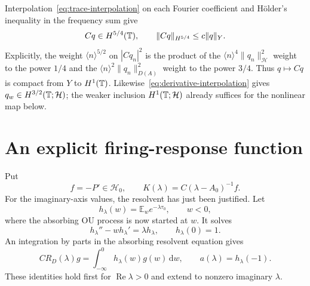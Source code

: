 \documentclass[11pt,a4paper]{article}
\numberwithin{equation}{section}
\theoremstyle{remark}\newtheorem{remark}[theorem]{Remark}
\newcommand{\HH}{\mathcal H}\newcommand{\DD}{\mathcal D}
\newcommand{\dd}{\,\mathrm d}
\DeclareMathOperator{\Rea}{Re}
\begin{document}
Interpolation~\eqref{eq:trace-interpolation} on each Fourier coefficient and H\"older's inequality in the frequency sum give
\begin{equation}\label{eq:time-trace}
 Cq\in H^{5/4}(\mathbb T),\qquad
 \|Cq\|_{H^{5/4}}\leq c\|q\|_Y.
\end{equation}
Explicitly, the weight $\langle n\rangle^{5/2}$ on $|Cq_n|^2$ is the product of the $\langle n\rangle^4\|q_n\|_\HH^2$ weight to the power $1/4$ and the $\langle n\rangle^2\|q_n\|_{D(A)}^2$ weight to the power $3/4$. Thus $q\mapsto Cq$ is compact from $Y$ to $H^1(\mathbb T)$. Likewise~\eqref{eq:derivative-interpolation} gives $q_w\in H^{3/2}(\T;\HH)$; the weaker inclusion $H^1(\T;\HH)$ already suffices for the nonlinear map below.

\section{An explicit firing-response function}
Put
\begin{equation}\label{eq:response}
 f=-P'\in\HH_0,
 \qquad K(\lambda)=C(\lambda-A_0)^{-1}f.
\end{equation}
For the imaginary-axis values, the resolvent has just been justified. Let
\[
 h_\lambda(w)=\mathbb E_w e^{-\lambda\tau_0},\qquad w<0,
\]
where the absorbing OU process is now started at $w$. It solves
\begin{equation}\label{eq:backward}
 h_\lambda''-w h_\lambda'=\lambda h_\lambda,
 \qquad h_\lambda(0)=1.
\end{equation}
An integration by parts in the absorbing resolvent equation gives
\[
 CR_D(\lambda)g=\int_{-\infty}^0h_\lambda(w)g(w)\dd w,
 \qquad a(\lambda)=h_\lambda(-1).
\]
These identities hold first for $\Rea\lambda>0$ and extend to nonzero imaginary $\lambda$.
\end{document}
